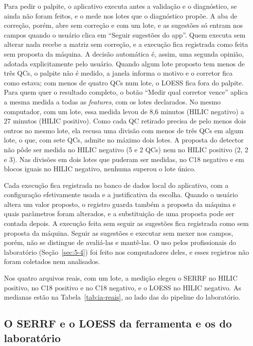 Para pedir o palpite, o aplicativo executa antes a validação e o diagnóstico, se ainda não foram feitos, e o mede nos lotes que o diagnóstico propõe. A aba de correção, porém, abre sem correção e com um lote, e as sugestões só entram nos campos quando o usuário clica em ``Seguir sugestões do app''. Quem executa sem alterar nada recebe a matriz sem correção, e a execução fica registrada como feita sem proposta da máquina. A decisão automática é, assim, uma segunda opinião, adotada explicitamente pelo usuário. Quando algum lote proposto tem menos de três QCs, o palpite não é medido, a janela informa o motivo e o corretor fica como estava; com menos de quatro QCs num lote, o LOESS fica fora do palpite. Para quem quer o resultado completo, o botão ``Medir qual corretor vence'' aplica a mesma medida a todas as \emph{features}, com os lotes declarados. No mesmo computador, com um lote, essa medida levou de 8,6 minutos (HILIC negativo) a 27 minutos (HILIC positivo). Como cada QC retirado precisa de pelo menos dois outros no mesmo lote, ela recusa uma divisão com menos de três QCs em algum lote, o que, com sete QCs, admite no máximo dois lotes. A proposta do detector não pôde ser medida no HILIC negativo (5 e 2 QCs) nem no HILIC positivo (2, 2 e 3). Nas divisões em dois lotes que puderam ser medidas, no C18 negativo e em blocos iguais no HILIC negativo, nenhuma superou o lote único.

Cada execução fica registrada no banco de dados local do aplicativo, com a configuração efetivamente usada e a justificativa da escolha. Quando o usuário altera um valor proposto, o registro guarda também a proposta da máquina e quais parâmetros foram alterados, e a substituição de uma proposta pode ser contada depois. A execução feita sem seguir as sugestões fica registrada como sem proposta da máquina. Seguir as sugestões e executar sem mexer nos campos, porém, não se distingue de avaliá-las e mantê-las. O uso pelos profissionais do laboratório (Seção~\ref{sec:5-4}) foi feito nos computadores deles, e esses registros não foram coletados nem analisados.

Nos quatro arquivos reais, com um lote, a medição elegeu o SERRF no HILIC positivo, no C18 positivo e no C18 negativo, e o LOESS no HILIC negativo. As medianas estão na Tabela~\ref{tab:ia-reais}, ao lado das do pipeline do laboratório.

\subsection{O SERRF e o LOESS da ferramenta e os do laboratório}

